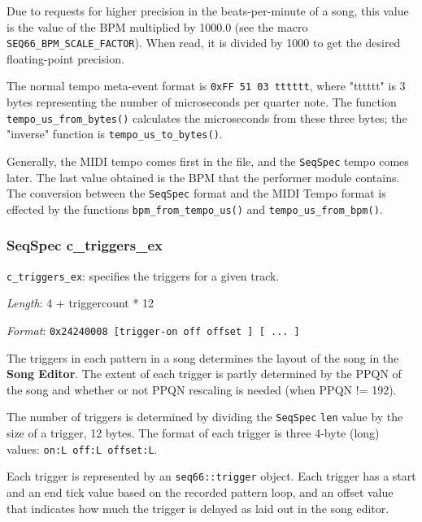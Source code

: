    Due to requests for higher precision in the beats-per-minute of a song, this
   value is the value of the BPM multiplied by 1000.0 (see the macro
   \texttt{SEQ66\_BPM\_SCALE\_FACTOR}).
   When read, it is divided by 1000 to get the desired floating-point precision.

   The normal tempo meta-event format is
   \texttt{0xFF 51 03 tttttt}, where "tttttt" is 3 bytes representing the number
   of microseconds per quarter note.
   The function \texttt{tempo\_us\_from\_bytes()} calculates the microseconds
   from these three bytes; the "inverse" function is
   \texttt{tempo\_us\_to\_bytes()}.

   Generally, the MIDI tempo comes first in the file, and the
   \texttt{SeqSpec} tempo comes later.
   The last value obtained is the BPM that the performer module contains.
   The conversion between the
   \texttt{SeqSpec} format and the MIDI Tempo format is
   effected by the functions
   \texttt{bpm\_from\_tempo\_us()} and \texttt{tempo\_us\_from\_bpm()}.

\subsubsection{SeqSpec c\_triggers\_ex}
\label{subsubsec:midi_format_track_seqspec_triggers_ex}

   \begin{description}
      \item \texttt{c\_triggers\_ex}: specifies the triggers for a given track.
      \item \textsl{Length}: 4 + triggercount * 12
      \item \textsl{Format}: \texttt{0x24240008 [trigger-on off offset ] [ ... ]}
   \end{description}

   The triggers in each pattern in a song determines the layout of the song in 
   the \textbf{Song Editor}.
   The extent of each trigger is partly determined by the PPQN of the song and
   whether or not PPQN rescaling is needed (when PPQN != 192).

   The number of triggers is determined by dividing the
   \texttt{SeqSpec} \texttt{len}
   value by the size of a trigger, 12 bytes.
   The format of each trigger is three 4-byte (long)
   values: \texttt{on:L off:L offset:L}.

   Each trigger is represented by an \texttt{seq66::trigger} object.
   Each trigger has a start and an end tick value based on the
   recorded pattern loop, and an offset value that indicates how much
   the trigger is delayed as laid out in the song editor.

